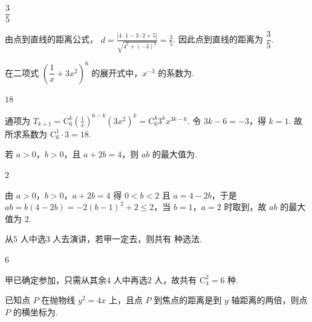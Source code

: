 \begin{answer}
\(\dfrac35\)
\end{answer}

\begin{solution}
由点到直线的距离公式，
\(d=\frac{|4\cdot1-3\cdot2+5|}{\sqrt{4^2+(-3)^2}}=\frac{3}{5}\).
因此点到直线的距离为 \(\dfrac35\).
\end{solution}

\begin{problem}
在二项式 \(\left(\dfrac1x+3x^2\right)^6\) 的展开式中，\(x^{-3}\) 的系数为\fillinblank{}.
\end{problem}

\begin{answer}
\(18\)
\end{answer}

\begin{solution}
通项为
\(T_{k+1}=\mathrm C_6^k\left(\frac1x\right)^{6-k}(3x^2)^k=\mathrm C_6^k3^kx^{3k-6}\).
令 \(3k-6=-3\)，得 \(k=1\). 故所求系数为 \(\mathrm C_6^1\cdot3=18\).
\end{solution}

\begin{problem}
若 \(a>0\)，\(b>0\)，且 \(a+2b=4\)，则 \(ab\) 的最大值为\fillinblank{}.
\end{problem}

\begin{answer}
\(2\)
\end{answer}

\begin{solution}
由 \(a>0\)，\(b>0\)，\(a+2b=4\) 得 \(0<b<2\) 且 \(a=4-2b\)，于是 \(ab=b(4-2b)=-2(b-1)^2+2\le2\)，当 \(b=1\)，\(a=2\) 时取到，故 \(ab\) 的最大值为 \(2\).
\end{solution}

\begin{problem}
从\(5\text{ 人}\)中选\(3\text{ 人}\)去演讲，若甲一定去，则共有\fillinblank{}\(\text{ 种}\)选法.
\end{problem}

\begin{answer}
\(6\)
\end{answer}

\begin{solution}
甲已确定参加，只需从其余\(4\text{ 人}\)中再选\(2\text{ 人}\)，故共有 \(\mathrm C_4^2=6\text{ 种}\).
\end{solution}

\begin{problem}
已知点 \(P\) 在抛物线 \(y^2=4x\) 上，且点 \(P\) 到焦点的距离是到 \(y\) 轴距离的两倍，则点 \(P\) 的横坐标为\fillinblank{}.
\end{problem}

